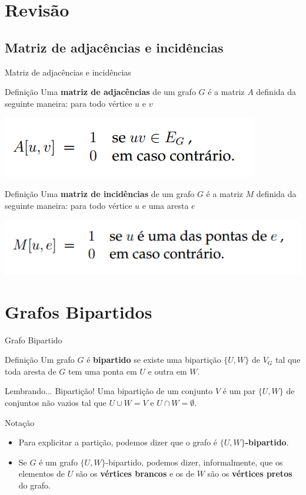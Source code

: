 \documentclass[xcolor=dvipsnames,table]{beamer}
\begin{document}
    \section{Revisão}
	\subsection{Matriz de adjacências e incidências}
	\begin{frame}{Matriz de adjacências e incidências}
		\begin{block}{Definição}
			Uma {\bf matriz de adjacências} de um grafo $G$ é a matriz $A$ definida da seguinte maneira: para todo vértice $u$ e $v$
			\begin{center}
				\includegraphics[width=.5\textwidth]{images/adjacencia.png}
			\end{center}
		\end{block} 
		\begin{block}{Definição}
			Uma {\bf matriz de incidências} de um grafo $G$ é a matriz $M$ definida da seguinte maneira: para todo vértice $u$ e uma aresta $e$
			\begin{center}
				\includegraphics[width=.6\textwidth]{images/incidencia.png}
			\end{center}
		\end{block}
	\end{frame}

	\section{Grafos Bipartidos}
	\begin{frame}{Grafo Bipartido}
		\begin{block}{Definição}
			Um grafo $G$ é {\bf bipartido} se existe uma bipartição $\{U, W \}$ de $V_G$ tal que toda aresta de $G$ tem uma ponta em $U$ e outra em $W$.
		\end{block} \pause
		\begin{block}{Lembrando... Bipartição!}
			Uma bipartição de um conjunto $V$ é um par $\{U, W\}$ de conjuntos não vazios tal que $U \cup W = V$ e $U \cap W = \emptyset$.
		\end{block} \pause
		\begin{block}{Notação}
			\begin{itemize}
				\item Para explicitar a partição, podemos dizer que o grafo é {\bf $\{ U, W \}$-bipartido}. \pause
				\item Se $G$ é um grafo $\{ U, W \}$-bipartido, podemos dizer, informalmente, que os elementos de $U$ são os {\bf vértices brancos} e os de $W$ são os {\bf vértices pretos} do grafo.
			\end{itemize}
		\end{block} 
	\end{frame}
	
\end{document}
